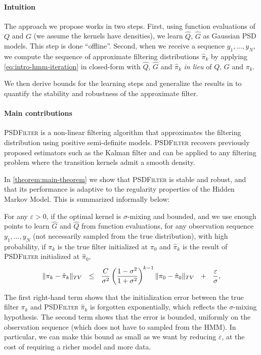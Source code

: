 \paragraph{Intuition}

The approach we propose works in two steps. First, using function evaluations of $Q$ and $G$ (we assume the kernels have densities), we learn $\hat Q$, $\hat G$ as Gaussian PSD models. This step is done ``offline''. Second, when we receive a sequence $y_1, \ldots, y_N$, we compute the sequence of approximate filtering distributions $\hat\pi_k$ by applying \cref{eq:intro-hmm-iteration} in closed-form with $\hat Q$, $\hat G$ and $\hat \pi_k$ \emph{in lieu} of $Q$, $G$ and $\pi_k$.

We then derive bounds for the learning steps and generalize the results in \cite{oudjane} to quantify the stability and robustness of the approximate filter.

\paragraph{Main contributions}
\textsc{PSDFilter} is a non-linear filtering algorithm that approximates the filtering distribution using positive semi-definite models. \textsc{PSDFilter} recovers previously proposed estimators such as the Kalman filter and can be applied to any filtering problem where the transition kernels admit a smooth density.

In \cref{theorem:main-theorem} we show that \textsc{PSDFilter} is stable and robust, and that its performance is adaptive to the regularity properties of the Hidden Markov Model. This is summarized informally below:
\begin{mdframed}
\begin{informaltheorem}
For any $\varepsilon > 0$, if the optimal kernel is $\sigma$-mixing and bounded, and we use enough points to learn $\hat G$ and $\hat Q$ from function evaluations, for any observation sequence $y_1, \ldots, y_N$ (not necessarily sampled from the true distribution), with high probability, if $\pi_k$ is the true filter initialized at $\pi_0$ and $\hat \pi_k$ is the result of \textsc{PSDFilter} initialized at $\hat \pi_0$,
\begin{align*}
    \Vert \pi_k - \hat\pi_k\Vert_{TV} ~~\leq~~ \frac{C}{\sigma^2}\left(\frac{1-\sigma^2}{1 + \sigma^2}\right)^{k-1}\|\pi_0 - \hat{\pi}_0\|_{TV} ~~+~~ \frac{\varepsilon}{\sigma},
\end{align*}
\end{informaltheorem}
\end{mdframed}
The first right-hand term shows that the initialization error between the true filter $\pi_k$ and \textsc{PSDFilter} $\hat \pi_k$ is forgotten exponentially, which reflects the $\sigma$-mixing hypothesis. The second term shows that the error is bounded, uniformly on the observation sequence (which does not have to sampled from the HMM). In particular, we can make this bound as small as we want by reducing $\varepsilon$, at the cost of requiring a richer model and more data.

